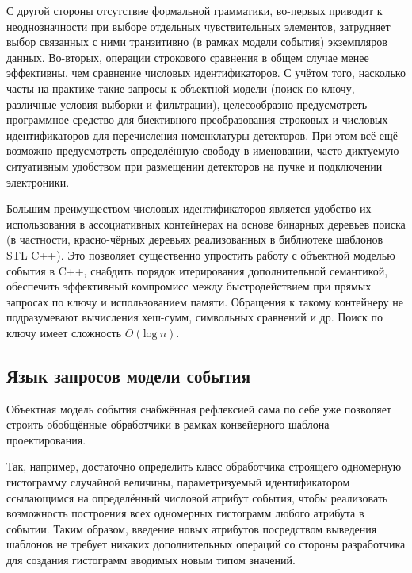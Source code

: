 С другой стороны отсутствие формальной грамматики, во-первых
приводит к неоднозначности при выборе отдельных чувствительных элементов,
затрудняет выбор связанных с ними транзитивно (в рамках модели
события) экземпляров данных.
Во-вторых, операции строкового сравнения в общем случае менее
эффективны, чем сравнение числовых идентификаторов. С учётом того,
насколько часты на практике такие запросы к объектной
модели (поиск по ключу, различные условия выборки и фильтрации),
целесообразно предусмотреть программное средство для биективного
преобразования строковых и числовых идентификаторов для перечисления
номенклатуры детекторов. При этом всё ещё возможно предусмотреть
определённую свободу в именовании, часто диктуемую ситуативным
удобством при размещении детекторов на пучке и подключении
электроники.

Большим преимуществом числовых идентификаторов является удобство
их использования в ассоциативных контейнерах на основе бинарных
деревьев поиска (в частности, красно-чёрных деревьях реализованных
в библиотеке шаблонов STL C++). Это позволяет существенно упростить
работу с объектной моделью события в C++, снабдить порядок
итерирования дополнительной семантикой, обеспечить эффективный
компромисс между быстродействием при прямых запросах по ключу
и использованием памяти. Обращения к такому контейнеру не подразумевают
вычисления хеш-сумм, символьных сравнений и др. Поиск по ключу имеет
сложность $O(\text{log}~n)$.


\subsection{Язык запросов модели события}

Объектная модель события снабжённая рефлексией сама по себе
уже позволяет строить обобщённые обработчики в рамках конвейерного
шаблона проектирования.

Так, например, достаточно определить класс обработчика строящего
одномерную гистограмму случайной величины, параметризуемый
идентификатором ссылающимся на определённый числовой атрибут события,
чтобы реализовать возможность построения всех одномерных гистограмм
любого атрибута в событии. Таким образом, введение новых атрибутов
посредством выведения шаблонов не требует никаких дополнительных
операций со стороны разработчика для создания гистограмм вводимых новым
типом значений.

